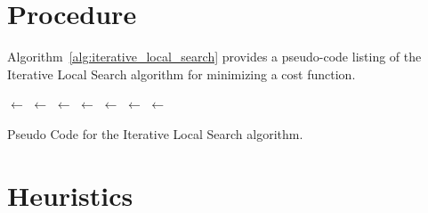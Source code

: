 \documentclass[a4paper, 11pt]{article}
\begin{document}
\section{Procedure}
\label{sec:procedure}
Algorithm~\ref{alg:iterative_local_search} provides a pseudo-code listing of the Iterative Local Search algorithm for minimizing a cost function.

\begin{algorithm}[ht]
	\SetLine
	\KwIn{}
	\KwOut{\Best}
	\Best $\leftarrow$ \ConstructInitialSolution{}\;
	\Best $\leftarrow$ \LocalSearch{}\;
	\SearchHistory $\leftarrow$ \Best\;
	\While{$\neg$ \StopCondition{}} {
		\Candidate $\leftarrow$ \Perturbation{\Best, \SearchHistory}\;
		\Candidate $\leftarrow$ \LocalSearch{\Candidate}\;
		\SearchHistory $\leftarrow$ \Candidate\;
		\If{\AcceptanceCriterion{\Best, \Candidate, \SearchHistory}} {
			\Best $\leftarrow$ \Candidate\;
		}
	}
	\Return{\Best}\;
	\caption{Pseudo Code for the Iterative Local Search algorithm.}
	\label{alg:iterative_local_search}
\end{algorithm}

\section{Heuristics}
\label{sec:heuristics}
\end{document}
